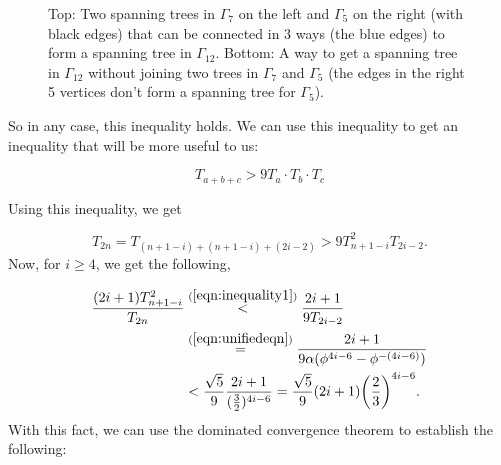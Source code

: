 \documentclass{amsart}
\theoremstyle{definition}
\newcommand{\yandi}[1]{\marginpar{\tiny \color{red} Yandi: #1}}
\begin{document}
\begin{figure}[H]
        \caption{Top: Two spanning trees in $\Gamma_7$ on the left and $\Gamma_5$ on the right (with black edges) that can be connected in 3 ways (the blue edges) to form a spanning tree in $\Gamma_{12}$. Bottom: A way to get a spanning tree in $\Gamma_{12}$ without joining two trees in $\Gamma_7$ and $\Gamma_5$ (the edges in the right 5 vertices don't form a spanning tree for $\Gamma_5$).}
        \label{fig:ineqexample2}
    \end{figure}
So in any case, this inequality holds. We can use this inequality to get an inequality that will be more useful to us: 

\begin{equation}\label{eqn:inequality}
    T_{a + b + c} > 9T_a \cdot T_b \cdot T_c
\end{equation}

Using this inequality, we get

\begin{equation}\label{eqn:inequality1}
   T_{2n} = T_{(n + 1 - i) + (n + 1 - i) + (2i - 2)} > 9T^2_{n + 1 - i} T_{2i - 2} .
\end{equation}
Now, for $i \geq 4$, we get the following, 


\begin{align*}\frac{(2i + 1)T_{n + 1 - i}^2}{T_{2n}} &\stackrel{(\ref{eqn:inequality1})}{<} \frac{2i + 1}{9T_{2i - 2}}\\
&\stackrel{(\ref{eqn:unifiedeqn})}{=} \frac{2i + 1}{9\alpha (\phi^{4i - 6} - \phi^{-(4i - 6)})}\\
&< \frac{\sqrt{5}}{9}\frac{2i + 1}{(\frac{3}{2})^{4i - 6}} = \frac{\sqrt{5}}{9}(2i + 1)\bigg(\frac{2}{3}\bigg)^{4i - 6}.
\end{align*}
With this fact, we can use the dominated convergence theorem to establish the following: 
\end{document}
